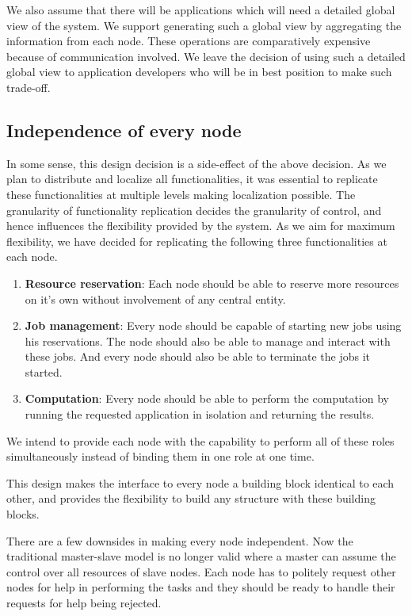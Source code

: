 We also assume that there will be applications which will need a detailed global
view of the system.  We support generating such a global view by aggregating the
information from each node.  These operations are comparatively expensive
because of communication involved.  We leave the decision of using such a
detailed global view to application developers who will be in best position to
make such trade-off.

\subsection{Independence of every node}
In some sense, this design decision is a side-effect of the above decision.  As we
plan to distribute and localize all functionalities, it was essential to replicate
these functionalities at multiple levels making localization possible.  The
granularity of functionality replication decides the granularity of control,
and hence influences the flexibility provided by the system.  As we aim for 
maximum flexibility, we have decided for replicating the following three
functionalities at each node.
\begin{enumerate}
\item \textbf{Resource reservation}: Each node should be able to reserve more
resources on it's own without involvement of any central entity.

\item \textbf{Job management}: Every node should be capable of starting new jobs
using his reservations. The node should also be able to manage and interact with
these jobs.  And every node should also be able to terminate the jobs it started.

\item \textbf{Computation}: Every node should be able to perform the computation 
by running the requested application in isolation and returning the results.

\end{enumerate}
We intend to provide each node with the capability to perform all of these roles
simultaneously instead of binding them in one role at one time.

This design makes the interface to every node a building block identical to each other, 
and provides the flexibility to build any structure with these building blocks.

There are a few downsides in making every node independent.  Now the traditional
master-slave model is no longer valid where a master can assume the control over
all resources of slave nodes.  Each node has to politely request other nodes for
help in performing the tasks and they should be ready to handle their requests
for help being rejected.

